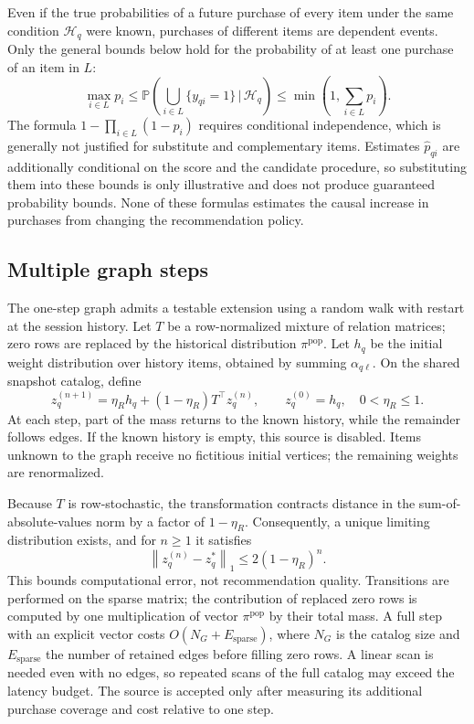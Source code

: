 \documentclass[12pt,a4paper]{article}
\newcommand{\Prob}{\mathbb P}
\newcommand{\norm}[1]{\left\lVert#1\right\rVert}
\newcommand{\given}{\,\vert\,}
\theoremstyle{plainru}
\begin{document}
Even if the true probabilities of a future purchase
of every item under the same condition $\mathcal H_q$ were known, purchases
of different items are dependent events. Only the general bounds
below hold for the probability of at least one purchase of an item in $L$:
\begin{equation}\label{eq:model-union-bounds}
\max_{i\in L}p_i\le
\Prob\!\left(\bigcup_{i\in L}\{y_{qi}=1\}\given\mathcal H_q\right)
\le\min\!\left(1,\sum_{i\in L}p_i\right).
\end{equation}
The formula $1-\prod_{i\in L}(1-p_i)$ requires conditional independence,
which is generally not justified for substitute and complementary items.
Estimates $\widehat p_{qi}$ are additionally conditional on the score and the candidate
procedure, so substituting them into these bounds is only
illustrative and does not produce guaranteed probability bounds.
None of these formulas estimates the causal increase in purchases
from changing the recommendation policy.

\subsection{Multiple graph steps}

The one-step graph admits a testable extension using a random
walk with restart at the session history.
Let $T$ be a row-normalized mixture of relation matrices;
zero rows are replaced by the historical distribution $\pi^{\mathrm{pop}}$.
Let $h_q$ be the initial weight distribution over history
items, obtained by summing $\alpha_{q\ell}$.
On the shared snapshot catalog, define
\begin{equation}\label{eq:model-ppr}
z_q^{(n+1)}=\eta_Rh_q+(1-\eta_R)T^\top z_q^{(n)},
\qquad z_q^{(0)}=h_q,\quad 0<\eta_R\le1.
\end{equation}
At each step, part of the mass returns to the known history,
while the remainder follows edges. If the known history is empty,
this source is disabled. Items unknown to the graph receive no
fictitious initial vertices; the remaining weights are renormalized.

Because $T$ is row-stochastic, the transformation contracts
distance in the sum-of-absolute-values norm by a factor of $1-\eta_R$.
Consequently, a unique limiting distribution exists,
and for $n\ge1$ it satisfies
\begin{equation}\label{eq:model-ppr-error}
\norm{z_q^{(n)}-z_q^*}_1\le2(1-\eta_R)^n.
\end{equation}
This bounds computational error, not recommendation quality.
Transitions are performed on the sparse matrix;
the contribution of replaced zero rows is computed by one multiplication
of vector $\pi^{\mathrm{pop}}$ by their total mass.
A full step with an explicit vector costs $O(N_G+E_{\mathrm{sparse}})$,
where $N_G$ is the catalog size and $E_{\mathrm{sparse}}$ the number of retained
edges before filling zero rows. A linear scan is needed even with no edges,
so repeated scans of the full catalog may exceed the latency
budget. The source is accepted only after measuring its additional
purchase coverage and cost relative to one step.
\end{document}
